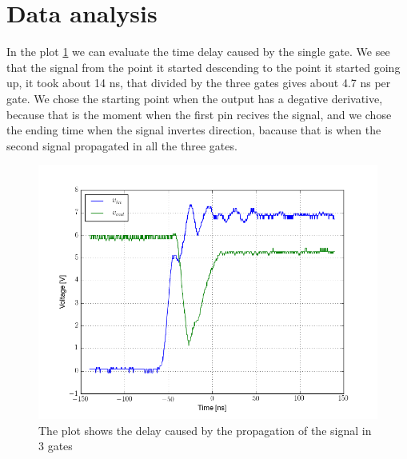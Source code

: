 \section{Data analysis}
In the plot \ref{latency_plot} we can evaluate the time delay caused by the single gate. We see that the signal from the point it started descending to the point it started going up, it took about 14 ns, that divided by the three gates gives about 4.7 ns per gate. We chose the starting point when the output has a degative derivative, because that is the moment when the first pin recives the signal, and we chose the ending time when the signal invertes direction, bacause that is when the second signal propagated in all the three gates.
\begin{figure}[H]
\centering
\includegraphics[width=.7\textwidth]{10/latency_plot.png}
\caption{The plot shows the delay caused by the propagation of the signal in 3 gates}\label{latency_plot}
\end{figure}
